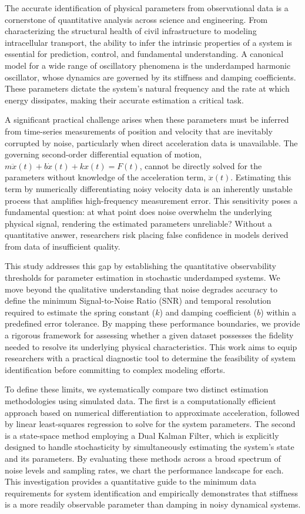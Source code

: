 \documentclass[]{article}
\begin{document}
The accurate identification of physical parameters from observational data is a cornerstone of quantitative analysis across science and engineering. From characterizing the structural health of civil infrastructure to modeling intracellular transport, the ability to infer the intrinsic properties of a system is essential for prediction, control, and fundamental understanding. A canonical model for a wide range of oscillatory phenomena is the underdamped harmonic oscillator, whose dynamics are governed by its stiffness and damping coefficients. These parameters dictate the system's natural frequency and the rate at which energy dissipates, making their accurate estimation a critical task.

A significant practical challenge arises when these parameters must be inferred from time-series measurements of position and velocity that are inevitably corrupted by noise, particularly when direct acceleration data is unavailable. The governing second-order differential equation of motion, $m\ddot{x}(t) + b\dot{x}(t) + kx(t) = F(t)$, cannot be directly solved for the parameters without knowledge of the acceleration term, $\ddot{x}(t)$. Estimating this term by numerically differentiating noisy velocity data is an inherently unstable process that amplifies high-frequency measurement error. This sensitivity poses a fundamental question: at what point does noise overwhelm the underlying physical signal, rendering the estimated parameters unreliable? Without a quantitative answer, researchers risk placing false confidence in models derived from data of insufficient quality.

This study addresses this gap by establishing the quantitative observability thresholds for parameter estimation in stochastic underdamped systems. We move beyond the qualitative understanding that noise degrades accuracy to define the minimum Signal-to-Noise Ratio (SNR) and temporal resolution required to estimate the spring constant ($k$) and damping coefficient ($b$) within a predefined error tolerance. By mapping these performance boundaries, we provide a rigorous framework for assessing whether a given dataset possesses the fidelity needed to resolve its underlying physical characteristics. This work aims to equip researchers with a practical diagnostic tool to determine the feasibility of system identification before committing to complex modeling efforts.

To define these limits, we systematically compare two distinct estimation methodologies using simulated data. The first is a computationally efficient approach based on numerical differentiation to approximate acceleration, followed by linear least-squares regression to solve for the system parameters. The second is a state-space method employing a Dual Kalman Filter, which is explicitly designed to handle stochasticity by simultaneously estimating the system's state and its parameters. By evaluating these methods across a broad spectrum of noise levels and sampling rates, we chart the performance landscape for each. This investigation provides a quantitative guide to the minimum data requirements for system identification and empirically demonstrates that stiffness is a more readily observable parameter than damping in noisy dynamical systems.
\end{document}
